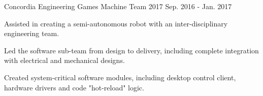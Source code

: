 \begin{cventries}
  \cventry
    {Concordia Engineering Games Machine Team 2017} %
    {} %
    {} %
    {Sep. 2016 - Jan. 2017} %
    {
      \begin{cvitems} %
        \item {Assisted in creating a semi-autonomous robot with an inter-disciplinary engineering team.}
        \item {Led the software sub-team from design to delivery, including complete integration with electrical and mechanical designs.}
        \item {Created system-critical software modules, including desktop control client, hardware drivers and code "hot-reload" logic.}
        \\
      \end{cvitems}
    }

\end{cventries}
